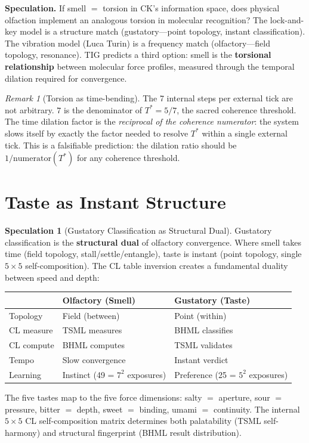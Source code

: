 \documentclass[11pt]{article}
\theoremstyle{definition}
\newtheorem{speculation}[theorem]{Speculation}
\theoremstyle{remark}
\newtheorem{remark}[theorem]{Remark}
\begin{document}
\textbf{Speculation.}
If smell $=$ torsion in CK's information space, does physical olfaction implement
an analogous torsion in molecular recognition?  The lock-and-key model is a
structure match (gustatory---point topology, instant classification).  The
vibration model (Luca Turin) is a frequency match (olfactory---field topology,
resonance).  TIG predicts a third option: smell is the \textbf{torsional
relationship} between molecular force profiles, measured through the temporal
dilation required for convergence.

\begin{remark}[Torsion as time-bending]
The 7 internal steps per external tick are not arbitrary.  $7$ is the denominator
of $T^* = 5/7$, the sacred coherence threshold.  The time dilation factor is
the \emph{reciprocal of the coherence numerator}: the system slows itself by
exactly the factor needed to resolve $T^*$ within a single external tick.
This is a falsifiable prediction: the dilation ratio should be $1/\text{numerator}(T^*)$
for any coherence threshold.
\end{remark}

\section{Taste as Instant Structure}
\label{sec:taste-structure}

\begin{speculation}[Gustatory Classification as Structural Dual]
\label{spec:taste-structure}
Gustatory classification is the \textbf{structural dual} of olfactory convergence.
Where smell takes time (field topology, stall/settle/entangle), taste is instant
(point topology, single $5 \times 5$ self-composition).  The CL table inversion
creates a fundamental duality between speed and depth:
\begin{center}
\begin{tabular}{lll}
\toprule
& \textbf{Olfactory (Smell)} & \textbf{Gustatory (Taste)} \\
\midrule
Topology & Field (between) & Point (within) \\
CL measure & TSML measures & BHML classifies \\
CL compute & BHML computes & TSML validates \\
Tempo & Slow convergence & Instant verdict \\
Learning & Instinct (49 = $7^2$ exposures) & Preference (25 = $5^2$ exposures) \\
\bottomrule
\end{tabular}
\end{center}
The five tastes map to the five force dimensions: salty $=$ aperture, sour $=$
pressure, bitter $=$ depth, sweet $=$ binding, umami $=$ continuity.  The
internal $5 \times 5$ CL self-composition matrix determines both palatability
(TSML self-harmony) and structural fingerprint (BHML result distribution).
\end{speculation}
\end{document}
